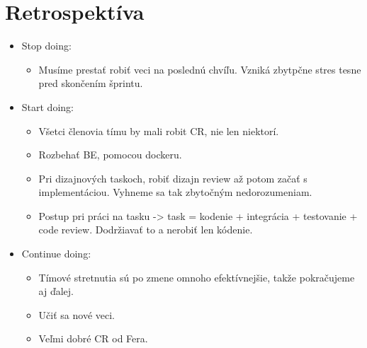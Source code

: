 \documentclass{article}
\begin{document}
    \section*{Retrospektíva}

        \begin{itemize}
            \item {Stop doing:}
                \begin{itemize}
                    \item {Musíme prestať robiť veci na poslednú chvíľu. Vzniká zbytpčne stres tesne pred skončením šprintu.}
                \end{itemize}
            \item {Start doing:}
                \begin{itemize}
                    \item {Všetci členovia tímu by mali robit CR, nie len niektorí.}
                    \item {Rozbehať BE, pomocou dockeru.}
                    \item {Pri dizajnových taskoch, robiť dizajn review až potom začať s implementáciou. Vyhneme sa tak zbytočným nedorozumeniam.}
                    \item {Postup pri práci na tasku -> task = kodenie + integrácia + testovanie + code review. Dodržiavať to a nerobiť len kódenie.}
                \end{itemize}
            \item {Continue doing:}
                \begin{itemize}
                    \item {Tímové stretnutia sú po zmene omnoho efektívnejšie, takže pokračujeme aj ďalej.}
                    \item {Učiť sa nové veci.}
                    \item {Veľmi dobré CR od Fera.}
                \end{itemize}
        \end{itemize}
\end{document}
